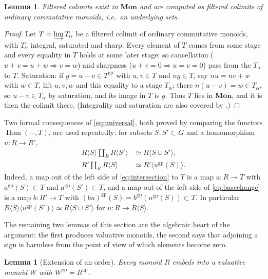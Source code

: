 \documentclass[12pt]{article}
\newcommand{\gp}{\mathrm{gp}}
\newcommand{\Hom}{\operatorname{Hom}}
\newtheorem{lemma}[theorem]{Lemma}
\theoremstyle{definition}
\theoremstyle{remark}
\begin{document}
\begin{lemma}\label{lem:filtered}
Filtered colimits exist in \(\mathbf{Mon}\) and are computed as filtered
colimits of ordinary commutative monoids, i.e.\ on underlying sets.
\end{lemma}

\begin{proof}
Let \(T=\varinjlim T_\alpha\) be a filtered colimit of ordinary commutative
monoids, with \(T_\alpha\) integral, saturated and sharp.  Every element of
\(T\) comes from some stage and every equality in \(T\) holds at some later
stage; so cancellation (\(u+v=u+w\Rightarrow v=w\)) and sharpness
(\(u+v=0\Rightarrow u=v=0\)) pass from the \(T_\alpha\) to \(T\).
Saturation: if \(g=u-v\in T^{\gp}\) with \(u,v\in T\) and \(ng\in T\), say
\(nu=nv+w\) with \(w\in T\), lift \(u,v,w\) and this equality to a stage
\(T_\alpha\); there \(n(u-v)=w\in T_\alpha\), so \(u-v\in T_\alpha\) by
saturation, and its image in \(T\) is \(g\).  Thus \(T\) lies in
\(\mathbf{Mon}\), and it is then the colimit there.  (Integrality and
saturation are also covered by \cite[Prop.~I.1.3.6]{ogus}.)
\end{proof}

Two formal consequences of \eqref{eq:universal}, both proved by comparing
the functors \(\Hom(-,T)\), are used repeatedly: for subsets
\(S,S'\subset G\) and a homomorphism \(u:R\to R'\),
\begin{align}
 R\langle S\rangle\amalg_R R\langle S'\rangle
       &\simeq R\langle S\cup S'\rangle, \label{eq:intersection}\\
 R'\amalg_R R\langle S\rangle
       &\simeq R'\langle u^{\gp}(S)\rangle .\label{eq:basechange}
\end{align}
Indeed, a map out of the left side of \eqref{eq:intersection} to \(T\) is a
map \(a:R\to T\) with \(a^{\gp}(S)\subset T\) and \(a^{\gp}(S')\subset T\),
and a map out of the left side of \eqref{eq:basechange} is a map
\(b:R'\to T\) with \((bu)^{\gp}(S)=b^{\gp}(u^{\gp}(S))\subset T\).
In particular \(R\langle S\rangle\langle u^{\gp}(S')\rangle
\simeq R\langle S\cup S'\rangle\) for \(u:R\to R\langle S\rangle\).

The remaining two lemmas of this section are the algebraic heart of the
argument: the first produces valuative monoids, the second says that
adjoining a sign is harmless from the point of view of which elements become
zero.

\begin{lemma}[Extension of an order]\label{lem:order}
Every monoid \(R\) embeds into a valuative monoid \(W\) with
\(W^{\gp}=R^{\gp}\).
\end{lemma}
\end{document}
